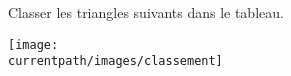 \begin{exercice}
    Classer les triangles suivants dans le tableau.
    \begin{center}
       \texttt{[image: \\currentpath/images/classement]}
    \end{center}
\end{exercice}